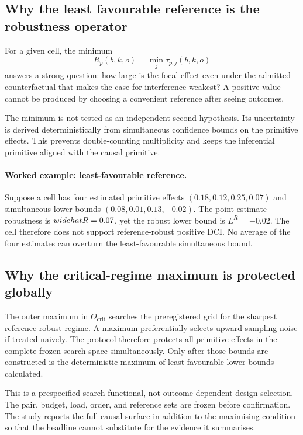 \documentclass[11pt,a4paper]{article}
\newcommand{\Tcrit}{\Theta_{\mathrm{crit}}}
\begin{document}
\subsection{Why the least favourable reference is the robustness operator}

For a given cell, the minimum
\[
R_p(b,k,o)=\min_j\tau_{p,j}(b,k,o)
\]
answers a strong question: how large is the focal effect even under the admitted counterfactual that makes the case for interference weakest? A positive value cannot be produced by choosing a convenient reference after seeing outcomes.

The minimum is not tested as an independent second hypothesis. Its uncertainty is derived deterministically from simultaneous confidence bounds on the primitive effects. This prevents double-counting multiplicity and keeps the inferential primitive aligned with the causal primitive.


\paragraph{Worked example: least-favourable reference.}
Suppose a cell has four estimated primitive effects $(0.18,0.12,0.25,0.07)$ and simultaneous lower bounds $(0.08,0.01,0.13,-0.02)$. The point-estimate robustness is $\\widehat R=0.07$, yet the robust lower bound is $L^R=-0.02$. The cell therefore does not support reference-robust positive DCI. No average of the four estimates can overturn the least-favourable simultaneous bound.

\subsection{Why the critical-regime maximum is protected globally}

The outer maximum in $\Tcrit$ searches the preregistered grid for the sharpest reference-robust regime. A maximum preferentially selects upward sampling noise if treated naively. The protocol therefore protects all primitive effects in the complete frozen search space simultaneously. Only after those bounds are constructed is the deterministic maximum of least-favourable lower bounds calculated.

This is a prespecified search functional, not outcome-dependent design selection. The pair, budget, load, order, and reference sets are frozen before confirmation. The study reports the full causal surface in addition to the maximising condition so that the headline cannot substitute for the evidence it summarises.
\end{document}
